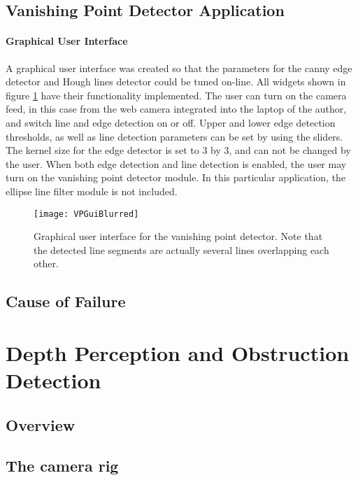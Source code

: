 \subsection{Vanishing Point Detector Application}

\paragraph{Graphical User Interface}

A graphical user interface was created so that the parameters for the canny edge detector and Hough lines detector could be tuned on-line. All widgets shown in figure \ref{fig:vpGui} have their functionality implemented. The user can turn on the camera feed, in this case from the web camera integrated into the laptop of the author, and switch line and edge detection on or off. Upper and lower edge detection thresholds, as well as line detection parameters can be set by using the sliders. The kernel size for the edge detector is set to 3 by 3, and can not be changed by the user. When both edge detection and line detection is enabled, the user may turn on the vanishing point detector module. In this particular application, the ellipse line filter module is not included.

\begin{figure}
	\texttt{[image: VPGuiBlurred]}
	\caption{Graphical user interface for the vanishing point detector. Note that the detected line segments are actually several lines overlapping each other.}
	\label{fig:vpGui}
\end{figure}

\subsection{Cause of Failure}

\section{Depth Perception and Obstruction Detection}

\subsection{Overview}

\subsection{The camera rig}

